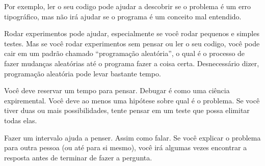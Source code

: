 
Por exemplo, ler o seu codigo pode ajudar a descobrir se o problema é
um erro tipográfico, mas não irá ajudar se o programa é um conceito
mal entendido.


Rodar experimentos pode ajudar, especialmente se você rodar pequenos e
simples testes. Mas se você rodar experimentos sem pensar ou ler o seu
codigo, você pode cair em um padrão chamado ``programação aleatória'',
o qual é o processo de fazer mudanças aleatórias até o programa
fazer a coisa certa. Desnecessário dizer, programação aleatória
pode levar bastante tempo.


Você deve reservar um tempo para pensar. Debugar é como uma ciência
expiremental. Você deve ao menos uma hipótese sobre qual é 
o problema. Se você tiver duas ou mais possibilidades, tente pensar
em um teste que possa elimitar todas elas.

Fazer um intervalo ajuda a penser. Assim como falar. Se você
explicar o problema para outra pessoa (ou até para si mesmo), você
irá algumas vezes encontrar a resposta antes de terminar de fazer a pergunta.


